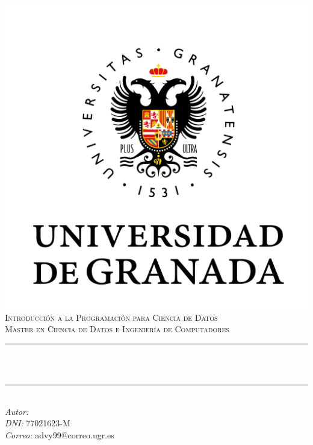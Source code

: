 \documentclass[12pt, spanish]{article}
\begin{document}


\begin{titlepage}
    \centering
    \vspace*{-2cm}
    \includegraphics[scale = 0.50]{ugr.png}\\[0.3 cm]
    \textsc{\large Introducción a la Programación para Ciencia de Datos}\\[0.5 cm]
    \textsc{\large Master en Ciencia de Datos e Ingeniería de Computadores}\\[0 cm]
    \rule{\linewidth}{0.2 mm} \\[0.4cm]
    { \Large \bfseries \thetitle}\\
    \rule{\linewidth}{0.2 mm} \\[1 cm]

     {\large
      \emph{Autor: } \theauthor\\
	   \emph{DNI:   }  77021623-M \\
      \emph{Correo:} advy99@correo.ugr.es}


\end{titlepage}
\end{document}
